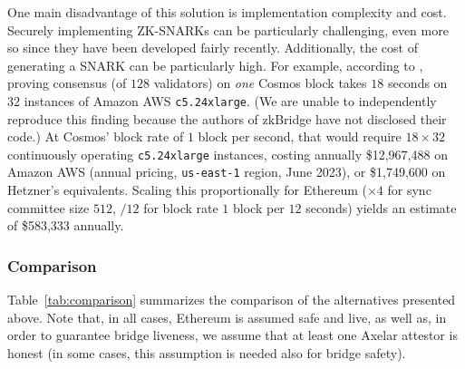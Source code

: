 One main disadvantage of this solution is implementation complexity and cost.
Securely implementing ZK-SNARKs can be particularly challenging, even more so
since they have been developed fairly recently. Additionally, the cost of
generating a SNARK can be particularly high. For example,
according to \cite{zkbridge}, proving consensus (of $128$ validators)
on \emph{one} Cosmos block
takes $18$ seconds on $32$ instances of Amazon AWS \texttt{c5.24xlarge}.
(We are unable to independently reproduce this finding because the authors of
zkBridge have not disclosed their code.)
At Cosmos' block rate of $1$ block per second,
that would require
$18 \times 32$ continuously operating \texttt{c5.24xlarge} instances,
costing annually
\$12,967,488 on Amazon AWS (annual pricing, \texttt{us-east-1} region, June 2023),
or \$1,749,600 on Hetzner's equivalents.
Scaling this proportionally for Ethereum
($\times 4$ for sync committee size $512$, $/12$ for block rate $1$ block per $12$ seconds)
yields an estimate of \$583,333 annually.

\subsubsection{Comparison}

Table~\ref{tab:comparison} summarizes the comparison of the alternatives
presented above. Note that, in all cases, Ethereum is assumed safe and live, as
well as, in order to guarantee bridge liveness, we assume that at least one
Axelar attestor is honest (in some cases, this assumption is needed also for
bridge safety).

